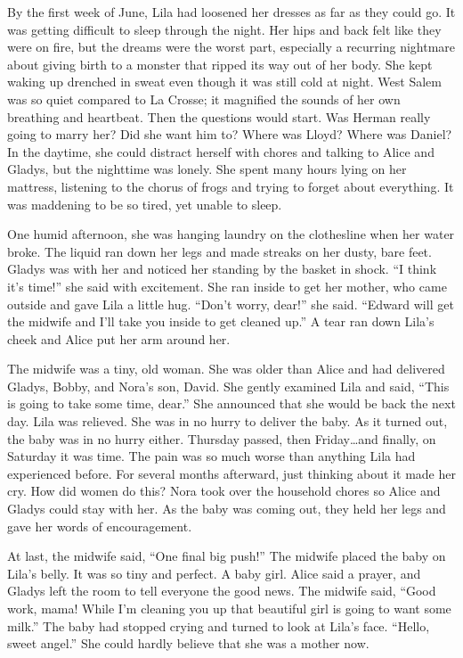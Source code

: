 \documentclass[
  american,
  letterpaper,
]{book}
\begin{document}
By the first week of June, Lila had loosened her dresses as far as they
could go. It was getting difficult to sleep through the night. Her hips
and back felt like they were on fire, but the dreams were the worst
part, especially a recurring nightmare about giving birth to a monster
that ripped its way out of her body. She kept waking up drenched in
sweat even though it was still cold at night. West Salem was so quiet
compared to La Crosse; it magnified the sounds of her own breathing and
heartbeat. Then the questions would start. Was Herman really going to
marry her? Did she want him to? Where was Lloyd? Where was Daniel? In
the daytime, she could distract herself with chores and talking to Alice
and Gladys, but the nighttime was lonely. She spent many hours lying on
her mattress, listening to the chorus of frogs and trying to forget
about everything. It was maddening to be so tired, yet unable to sleep.

One humid afternoon, she was hanging laundry on the clothesline when her
water broke. The liquid ran down her legs and made streaks on her dusty,
bare feet. Gladys was with her and noticed her standing by the basket in
shock. ``I think it's time!'' she said with excitement. She ran inside
to get her mother, who came outside and gave Lila a little hug. ``Don't
worry, dear!'' she said. ``Edward will get the midwife and I'll take you
inside to get cleaned up.'' A tear ran down Lila's cheek and Alice put
her arm around her.

The midwife was a tiny, old woman. She was older than Alice and had
delivered Gladys, Bobby, and Nora's son, David. She gently examined Lila
and said, ``This is going to take some time, dear.'' She announced that
she would be back the next day. Lila was relieved. She was in no hurry
to deliver the baby. As it turned out, the baby was in no hurry either.
Thursday passed, then Friday\ldots and finally, on Saturday it was time.
The pain was so much worse than anything Lila had experienced before.
For several months afterward, just thinking about it made her cry. How
did women do this? Nora took over the household chores so Alice and
Gladys could stay with her. As the baby was coming out, they held her
legs and gave her words of encouragement.

At last, the midwife said, ``One final big push!'' The midwife placed
the baby on Lila's belly. It was so tiny and perfect. A baby girl. Alice
said a prayer, and Gladys left the room to tell everyone the good news.
The midwife said, ``Good work, mama! While I'm cleaning you up that
beautiful girl is going to want some milk.'' The baby had stopped crying
and turned to look at Lila's face. ``Hello, sweet angel.'' She could
hardly believe that she was a mother now.
\end{document}
